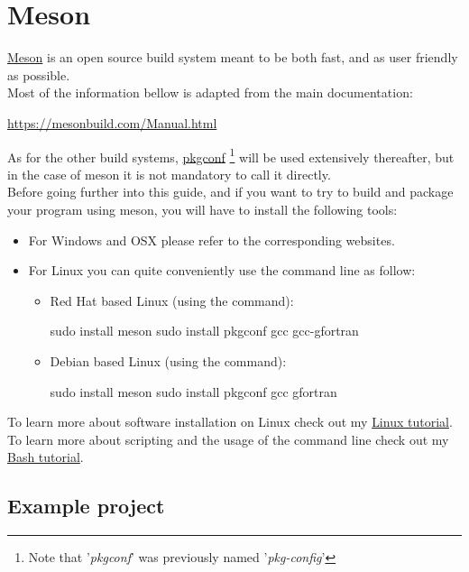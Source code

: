 \section{Meson}
\href{https://mesonbuild.com}{Meson} is an open source build system meant to be both fast, and as user friendly as possible. \\
Most of the information bellow is adapted from the main documentation:
\begin{center}\href{https://mesonbuild.com/Manual.html}{https://mesonbuild.com/Manual.html}\end{center}
As for the other build systems, \href{https://en.wikipedia.org/wiki/Pkg-config}{pkgconf} \footnote{Note that '{\em{pkgconf}}' was previously named '{\em{pkg-config}}'}  will be used extensively thereafter, but in the case of meson it is not mandatory to call it directly. \\
Before going further into this guide, and if you want to try to build and package your program using meson, you will have to install the following tools: 
\begin{itemize}
\item For Windows and OSX please refer to the corresponding websites.
\item For Linux you can quite conveniently use the command line as follow:
\begin{itemize}
\item Red Hat based Linux (using the  command):
\begin{scriptii}
\fprompt{~} sudo  install meson
\fprompt{~} sudo  install pkgconf gcc gcc-gfortran
\end{scriptii}
\item Debian based Linux (using the  command):
\begin{scriptii}
\uprompt{~} sudo  install meson
\uprompt{~} sudo  install pkgconf gcc gfortran
\end{scriptii}
\end{itemize}
\end{itemize}
To learn more about software installation on Linux check out my \href{https://www.ipcms.fr/wp-content/uploads/2021/11/linux.pdf}{Linux tutorial}. \\
To learn more about scripting and the usage of the command line check out my \href{https://www.ipcms.fr/wp-content/uploads/2021/05/bash.pdf}{Bash tutorial}. 

\subsection{Example project}

